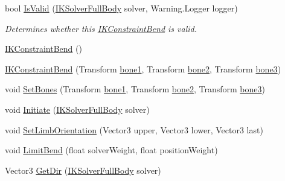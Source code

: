 \begin{DoxyCompactItemize}
\item 
bool \mbox{\hyperlink{class_root_motion_1_1_final_i_k_1_1_i_k_constraint_bend_ac46456389e0db3ba3d368b6b3360c7f6}{Is\+Valid}} (\mbox{\hyperlink{class_root_motion_1_1_final_i_k_1_1_i_k_solver_full_body}{I\+K\+Solver\+Full\+Body}} solver, Warning.\+Logger logger)
\begin{DoxyCompactList}\small\item\em Determines whether this \mbox{\hyperlink{class_root_motion_1_1_final_i_k_1_1_i_k_constraint_bend}{I\+K\+Constraint\+Bend}} is valid. \end{DoxyCompactList}\item 
\mbox{\hyperlink{class_root_motion_1_1_final_i_k_1_1_i_k_constraint_bend_a9327084c04a0563a840d5034a1ef5bd2}{I\+K\+Constraint\+Bend}} ()
\item 
\mbox{\hyperlink{class_root_motion_1_1_final_i_k_1_1_i_k_constraint_bend_a989522e1c283b5af8c6ab4ce78ab4a14}{I\+K\+Constraint\+Bend}} (Transform \mbox{\hyperlink{class_root_motion_1_1_final_i_k_1_1_i_k_constraint_bend_ab6e75695e82a3482750957d897f151c0}{bone1}}, Transform \mbox{\hyperlink{class_root_motion_1_1_final_i_k_1_1_i_k_constraint_bend_a99406d65ccfc0a4d9abdf07639f9cff9}{bone2}}, Transform \mbox{\hyperlink{class_root_motion_1_1_final_i_k_1_1_i_k_constraint_bend_aa255be86be652ea30ee9c4fcd1094a29}{bone3}})
\item 
void \mbox{\hyperlink{class_root_motion_1_1_final_i_k_1_1_i_k_constraint_bend_ab38e28d0128cdf34a005dfe9a3f74bf9}{Set\+Bones}} (Transform \mbox{\hyperlink{class_root_motion_1_1_final_i_k_1_1_i_k_constraint_bend_ab6e75695e82a3482750957d897f151c0}{bone1}}, Transform \mbox{\hyperlink{class_root_motion_1_1_final_i_k_1_1_i_k_constraint_bend_a99406d65ccfc0a4d9abdf07639f9cff9}{bone2}}, Transform \mbox{\hyperlink{class_root_motion_1_1_final_i_k_1_1_i_k_constraint_bend_aa255be86be652ea30ee9c4fcd1094a29}{bone3}})
\item 
void \mbox{\hyperlink{class_root_motion_1_1_final_i_k_1_1_i_k_constraint_bend_aea4a2e10fa5909248e31dbc265eaabc4}{Initiate}} (\mbox{\hyperlink{class_root_motion_1_1_final_i_k_1_1_i_k_solver_full_body}{I\+K\+Solver\+Full\+Body}} solver)
\item 
void \mbox{\hyperlink{class_root_motion_1_1_final_i_k_1_1_i_k_constraint_bend_a3327f8fd69fc29aa83ae41434b23a30a}{Set\+Limb\+Orientation}} (Vector3 upper, Vector3 lower, Vector3 last)
\item 
void \mbox{\hyperlink{class_root_motion_1_1_final_i_k_1_1_i_k_constraint_bend_ab4f9040070d57243b4f0469ec04fb034}{Limit\+Bend}} (float solver\+Weight, float position\+Weight)
\item 
Vector3 \mbox{\hyperlink{class_root_motion_1_1_final_i_k_1_1_i_k_constraint_bend_a175f4d6c2cc5a4e0380082f864c9e8b9}{Get\+Dir}} (\mbox{\hyperlink{class_root_motion_1_1_final_i_k_1_1_i_k_solver_full_body}{I\+K\+Solver\+Full\+Body}} solver)
\end{DoxyCompactItemize}
